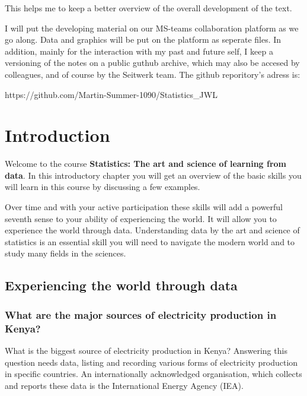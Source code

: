 \documentclass[
  letterpaper,
]{scrbook}
\begin{document}
This helps me to keep a better overview of the overall development of
the text.

I will put the developing material on our MS-teams collaboration
platform as we go along. Data and graphics will be put on the platform
as seperate files. In addition, mainly for the interaction with my past
and future self, I keep a versioning of the notes on a public guthub
archive, which may also be accesed by colleagues, and of course by the
Seitwerk team. The github reporitory's adress is:

https://github.com/Martin-Summer-1090/Statistics\_JWL


\hypertarget{introduction}{%
\chapter{\texorpdfstring{\textbf{Introduction}}{Introduction}}\label{introduction}}

Welcome to the course \textbf{Statistics: The art and science of
learning from data}. In this introductory chapter you will get an
overview of the basic skills you will learn in this course by discussing
a few examples.

Over time and with your active participation these skills will add a
powerful seventh sense to your ability of experiencing the world. It
will allow you to experience the world through data. Understanding data
by the art and science of statistics is an essential skill you will need
to navigate the modern world and to study many fields in the sciences.

\hypertarget{experiencing-the-world-through-data}{%
\section{Experiencing the world through
data}\label{experiencing-the-world-through-data}}

\hypertarget{what-are-the-major-sources-of-electricity-production-in-kenya}{%
\subsection{What are the major sources of electricity production in
Kenya?}\label{what-are-the-major-sources-of-electricity-production-in-kenya}}

What is the biggest source of electricity production in Kenya? Answering
this question needs data, listing and recording various forms of
electricity production in specific countries. An internationally
acknowledged organisation, which collects and reports these data is the
International Energy Agency (IEA).
\end{document}
